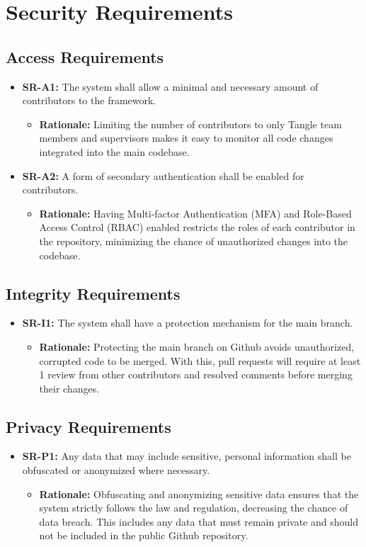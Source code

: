 \documentclass[12pt]{article}
\begin{document}
\section{Security Requirements}
\subsection{Access Requirements}
\begin{itemize}
  \item \textbf{SR-A1:} The system shall allow a minimal and necessary amount of contributors to the framework.
  \begin{itemize}
    \item \textbf{Rationale:} Limiting the number of contributors to only Tangle team members and supervisors makes it easy to monitor all code changes integrated into the main codebase.
  \end{itemize}
  \item \textbf{SR-A2:} A form of secondary authentication shall be enabled for contributors.
  \begin{itemize}
    \item \textbf{Rationale:} Having Multi-factor Authentication (MFA) and Role-Based Access Control (RBAC) enabled restricts the roles of each contributor in the repository, minimizing the chance of unauthorized changes into the codebase.
  \end{itemize}
\end{itemize}

\subsection{Integrity Requirements}
\begin{itemize}
  \item \textbf{SR-I1:} The system shall have a protection mechanism for the main branch.
  \begin{itemize}
    \item \textbf{Rationale:} Protecting the main branch on Github avoids unauthorized, corrupted code to be merged. With this, pull requests will require at least 1 review from other contributors and resolved comments before merging their changes.
  \end{itemize}
\end{itemize}

\subsection{Privacy Requirements}
\begin{itemize}
  \item \textbf{SR-P1:} Any data that may include sensitive, personal information shall be obfuscated or anonymized where necessary.
  \begin{itemize}
    \item \textbf{Rationale:} Obfuscating and anonymizing sensitive data ensures that the system strictly follows the law and regulation, decreasing the chance of data breach. This includes any data that must remain private and should not be included in the public Github repository.
  \end{itemize}
\end{itemize}
\end{document}
